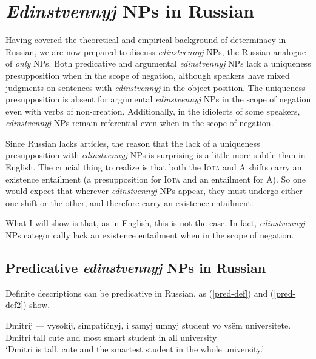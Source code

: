 \section{\textit{Edinstvennyj} NPs in Russian \label{sec:only-nps-russian}}
Having covered the theoretical and empirical background of determinacy in Russian, we are now prepared to discuss \textit{edinstvennyj} NPs, the Russian analogue of \textit{only} NPs. Both predicative and argumental \textit{edinstvennyj} NPs lack a uniqueness presupposition when in the scope of negation, although speakers have mixed judgments on sentences with \textit{edinstvennyj} in the object position. The uniqueness presupposition is absent for argumental \textit{edinstvennyj} NPs in the scope of negation even with verbs of non-creation. Additionally, in the idiolects of some speakers, \textit{edinstvennyj} NPs remain referential even when in the scope of negation.

Since Russian lacks articles, the reason that the lack of a uniqueness presupposition with \textit{edinstvennyj} NPs is surprising is a little more subtle than in English. The crucial thing to realize is that both the \textsc{Iota} and \textsc{A} shifts carry an existence entailment (a presupposition for \textsc{Iota} and an entailment for \textsc{A}). So one would expect that wherever \textit{edinstvennyj} NPs appear, they must undergo either one shift or the other, and therefore carry an existence entailment.

What I will show is that, as in English, this is not the case. In fact, \textit{edinstvennyj} NPs categorically lack an existence entailment when in the scope of negation.

\subsection{Predicative \textit{edinstvennyj} NPs in Russian}
Definite descriptions can be predicative in Russian, as (\ref{pred-def}) and (\ref{pred-def2}) show.

\begin{exe}
	\ex \label{pred-def} \gll Dmitrij --- vysokij, simpati\v{c}nyj, i samyj umnyj student vo vs\"{e}m universitete.\\
	Dmitri {} tall cute and most smart student in all university\\
	\glt `Dmitri is tall, cute and the smartest student in the whole university.'

\end{exe}

